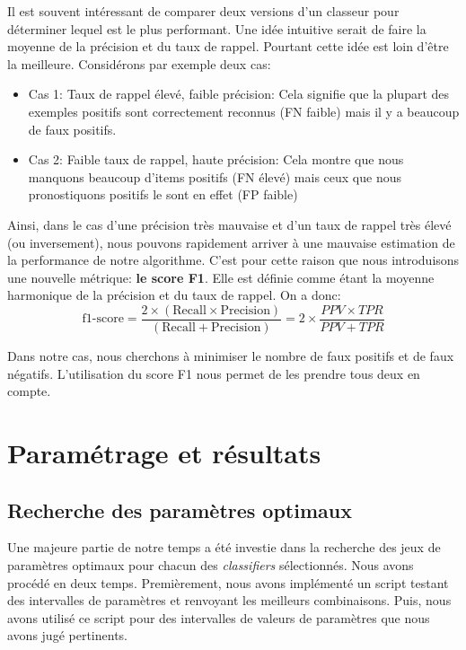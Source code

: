 \documentclass[a4paper]{report}
\begin{document}
Il est souvent intéressant de comparer deux versions d'un classeur pour déterminer lequel est le plus performant. Une idée intuitive serait de faire la moyenne de la précision et du taux de rappel. Pourtant cette idée est loin d'être la meilleure. Considérons par exemple deux cas:
\begin{itemize}

\item Cas 1: Taux de rappel élevé, faible précision: Cela signifie que la plupart des exemples positifs sont correctement reconnus (FN faible) mais il y a beaucoup de faux positifs.

\item Cas 2: Faible taux de rappel, haute précision: Cela montre que nous manquons beaucoup d'items positifs (FN élevé) mais ceux que nous pronostiquons positifs le sont en effet (FP faible)
\end{itemize}

\medskip
Ainsi, dans le cas d'une précision très mauvaise et d'un taux de rappel très élevé (ou inversement), nous pouvons rapidement arriver à une mauvaise estimation de la performance de notre algorithme. C'est pour cette raison que nous introduisons une nouvelle métrique: \textbf{le score F1}. Elle est définie comme étant la moyenne harmonique de la précision et du taux de rappel. On a donc:
\begin{equation}
	\text{f1-score} = \dfrac{2\times(\text{Recall} \times \text{Precision})}{(\text{Recall} + \text{Precision})} = 2\times\dfrac{PPV \times TPR}{PPV + TPR}
\end{equation}

Dans notre cas, nous cherchons à minimiser le nombre de faux positifs et de faux négatifs. L'utilisation du score F1 nous permet de les prendre tous deux en compte.

\chapter{Paramétrage et résultats}

\section{Recherche des paramètres optimaux}

Une majeure partie de notre temps a été investie dans la recherche des jeux de paramètres optimaux pour chacun des \emph{classifiers} sélectionnés. Nous avons procédé en deux temps. Premièrement, nous avons implémenté un script testant des intervalles de paramètres et renvoyant les meilleurs combinaisons. Puis, nous avons utilisé ce script pour des intervalles de valeurs de paramètres que nous avons jugé pertinents.
\end{document}
